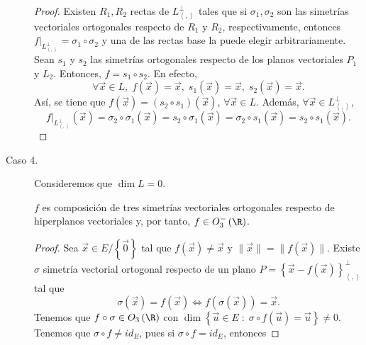 \begin{description}
\begin{proof}
	Existen $\displaystyle R_{1}, R_{2} $ rectas de $\displaystyle L^{\perp }_{\left\langle ,  \right\rangle } $ tales que si $\displaystyle \sigma_{1}, \sigma_{2} $ son las simetrías vectoriales ortogonales respecto de $\displaystyle R_{1} $ y $\displaystyle R_{2} $, respectivamente, entonces $\displaystyle f|_{L^{\perp }_{\left\langle ,  \right\rangle }} = \sigma_{1}\circ\sigma_{2} $ y una de las rectas base la puede elegir arbitrariamente. Sean $\displaystyle s_{1} $ y $\displaystyle s_{2} $ las simetrías ortogonales respecto de los planos vectoriales $\displaystyle P_{1} $ y $\displaystyle L_{2} $. Entonces, $\displaystyle f = s_{1}\circ s_{2} $. En efecto,
	\[\forall \vec{x} \in L, \; f\left(\vec{x}\right) = \vec{x}, \; s_{1}\left(\vec{x}\right)= \vec{x}, \; s_{2}\left(\vec{x}\right) = \vec{x} .\]
	Así, se tiene que $\displaystyle f\left(\vec{x}\right) = \left(s_{2}\circ s_{1}\right)\left(\vec{x}\right) $, $\displaystyle \forall \vec{x} \in L $. Además, $\displaystyle \forall \vec{x} \in L^{\perp }_{\left\langle ,  \right\rangle } $,
	\[f|_{L^{\perp }_{\left\langle ,  \right\rangle }}\left(\vec{x}\right) = \sigma_{2}\circ\sigma_{1}\left(\vec{x}\right) = s_{2}\circ \sigma_{1}\left(\vec{x}\right) = \sigma_{2}\circ s_{1}\left(\vec{x}\right) = s _{2} \circ s_{1}\left(\vec{x}\right) .\]
	\end{proof}
\item[Caso 4.] Consideremos que $\displaystyle \dim L = 0 $.
	\begin{ftheorem}[]
	\normalfont $\displaystyle f $ es composición de tres simetrías vectoriales ortogonales respecto de hiperplanos vectoriales y, por tanto, $\displaystyle f \in O^{-}_{3}\left(\R\right) $.
	\end{ftheorem}
\begin{proof}
	Sea $\displaystyle \vec{x} \in E / \left\{ \vec{0}\right\}  $ tal que $\displaystyle f\left(\vec{x}\right) \neq \vec{x} $ y $\displaystyle \|\vec{x}\| = \|f\left(\vec{x}\right)\| $. Existe $\displaystyle \sigma $ simetría vectorial ortogonal respecto de un plano $\displaystyle P = \left\{ \vec{x}-f\left(\vec{x}\right)\right\} ^{\perp }_{\left\langle ,  \right\rangle } $ tal que 
	\[\sigma\left(\vec{x}\right) = f\left(\vec{x}\right) \iff f\left(\sigma\left(\vec{x}\right)\right) = \vec{x} .\]
	Tenemos que $\displaystyle f \circ \sigma \in O_{3}\left(\R\right) $ con $\displaystyle \dim \left\{ \vec{u} \in E \; : \; \sigma\circ f\left(\vec{u}\right) = \vec{u}\right\} \neq 0 $. Tenemos que $\displaystyle \sigma\circ f \neq id _{E} $, pues si $\displaystyle \sigma \circ f = id _{E} $, entonces 

\end{proof}
\end{description}
